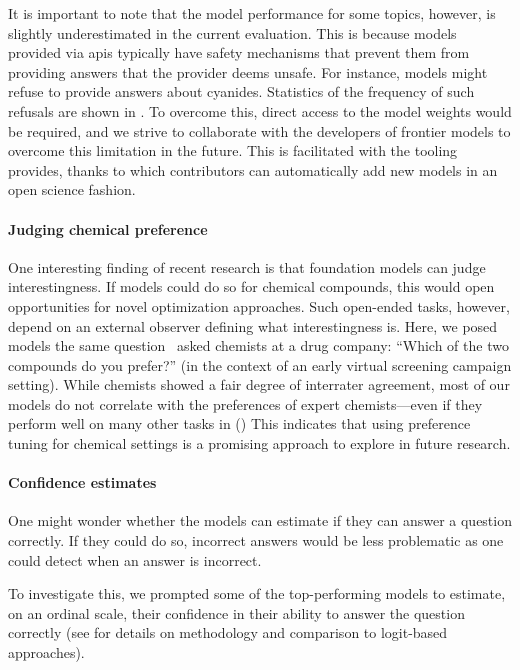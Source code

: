 \documentclass[11pt, oneside]{article}
\begin{document}
\begin{refsection}
It is important to note that the model performance for some topics, however, is slightly underestimated in the current evaluation.
 This is because models provided via \glspl{api} typically have safety mechanisms that prevent them from providing answers that the provider deems unsafe.
 For instance, models might refuse to provide answers about cyanides. Statistics of the frequency of such refusals are shown in .
 To overcome this, direct access to the model weights would be required, and we strive to collaborate with the developers of frontier models to overcome this limitation in the future.
 This is facilitated with the tooling \chembench provides, thanks to which contributors can automatically add new models in an open science fashion.

\paragraph{Judging chemical preference}

One interesting finding of recent research is that foundation models can judge interestingness.\autocite{zhang2024omniopenendednessmodelshuman, Argyle_2023}
If models could do so for chemical compounds, this would open opportunities for novel optimization approaches.
Such open-ended tasks, however, depend on an external observer defining what interestingness is.\autocite{hughes2024openendednessessentialartificialsuperhuman}
Here, we posed models the same question~\textcite{Choung_2023} asked chemists at a drug company: \enquote{Which of the two compounds do you prefer?} (in the context of an early virtual screening campaign setting).
While chemists showed a fair degree of interrater agreement, most of our models do not correlate with the preferences of expert chemists---even if they perform well on many other tasks in \chembench ()
This indicates that using preference tuning for chemical settings is a promising approach to explore in future research.


\paragraph{Confidence estimates} One might wonder whether the models can estimate if they can answer a question correctly.
If they could do so, incorrect answers would be less problematic as one could detect when an answer is incorrect.

To investigate this, we prompted\autocite{xiong2023llms} some of the top-performing models to estimate, on an ordinal scale, their confidence in their ability to answer the question correctly (see  for details on methodology and comparison to logit-based approaches).


\end{refsection}
\end{document}
